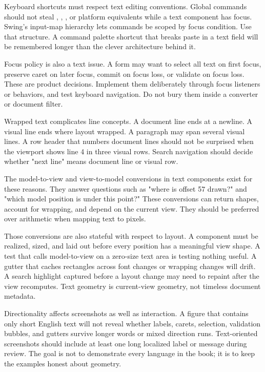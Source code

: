 Keyboard shortcuts must respect text editing conventions. Global commands should not steal , , , or platform equivalents while a text component has focus. Swing's input-map hierarchy lets commands be scoped by focus condition. Use that structure. A command palette shortcut that breaks paste in a text field will be remembered longer than the clever architecture behind it.

Focus policy is also a text issue. A form may want to select all text on first focus, preserve caret on later focus, commit on focus loss, or validate on focus loss. These are product decisions. Implement them deliberately through focus listeners or behaviors, and test keyboard navigation. Do not bury them inside a converter or document filter.

Wrapped text complicates line concepts. A document line ends at a newline. A visual line ends where layout wrapped. A paragraph may span several visual lines. A row header that numbers document lines should not be surprised when the viewport shows line 4 in three visual rows. Search navigation should decide whether "next line" means document line or visual row.

The model-to-view and view-to-model conversions in text components exist for these reasons. They answer questions such as "where is offset 57 drawn?" and "which model position is under this point?" These conversions can return shapes, account for wrapping, and depend on the current view. They should be preferred over arithmetic when mapping text to pixels.

Those conversions are also stateful with respect to layout. A component must be
realized, sized, and laid out before every position has a meaningful view
shape. A test that calls model-to-view on a zero-size text area is testing
nothing useful. A gutter that caches rectangles across font changes or wrapping
changes will drift. A search highlight captured before a layout change may need
to repaint after the view recomputes. Text geometry is current-view geometry,
not timeless document metadata.

Directionality affects screenshots as well as interaction. A figure that
contains only short English text will not reveal whether labels, carets,
selection, validation bubbles, and gutters survive longer words or mixed
direction runs. Text-oriented screenshots should include at least one long
localized label or message during review. The goal is not to demonstrate every
language in the book; it is to keep the examples honest about geometry.

